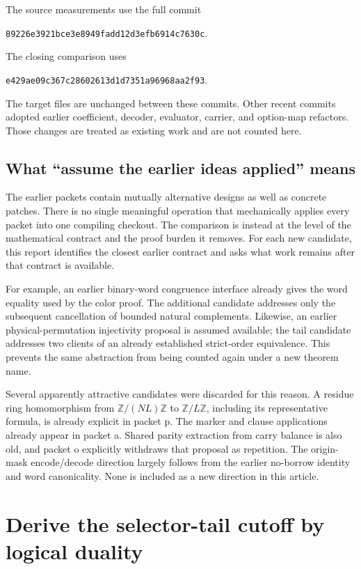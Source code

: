 \documentclass[11pt]{article}
\begin{document}
The source measurements use the full commit
\begin{center}\small\texttt{89226e3921bce3e8949fadd12d3efb6914c7630c}.\end{center}
The closing comparison uses
\begin{center}\small\texttt{e429ae09c367c28602613d1d7351a96968aa2f93}.\end{center}
The target files are unchanged between these commits. Other recent commits
adopted earlier coefficient, decoder, evaluator, carrier, and option-map
refactors. Those changes are treated as existing work and are not counted here.

\subsection{What ``assume the earlier ideas applied'' means}

The earlier packets contain mutually alternative designs as well as concrete
patches. There is no single meaningful operation that mechanically applies
every packet into one compiling checkout. The comparison is instead at the
level of the mathematical contract and the proof burden it removes. For each
new candidate, this report identifies the closest earlier contract and asks
what work remains after that contract is available.

For example, an earlier binary-word congruence interface already gives the
word equality used by the color proof. The additional candidate addresses only
the subsequent cancellation of bounded natural complements. Likewise, an
earlier physical-permutation injectivity proposal is assumed available; the
tail candidate addresses two clients of an already established strict-order
equivalence. This prevents the same abstraction from being counted again
under a new theorem name.

Several apparently attractive candidates were discarded for this reason.
A residue ring homomorphism from \(\mathbb Z/(N L)\mathbb Z\) to
\(\mathbb Z/L\mathbb Z\), including its representative formula, is already
explicit in packet p. The marker and clause applications already appear in
packet a. Shared parity extraction from carry balance is also old, and packet
o explicitly withdraws that proposal as repetition. The origin-mask
encode/decode direction largely follows from the earlier no-borrow identity
and word canonicality. None is included as a new direction in this article.

\section{Derive the selector-tail cutoff by logical duality}
\end{document}
